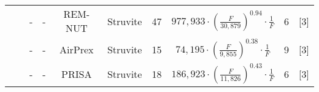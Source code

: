\documentclass[authoryear]{elsarticle}
\begin{document}
\begin{sidewaystable}[!htbp]
{\begin{threeparttable}
\begin{tabular}{@{}cccccccccc@{}}
				&                                                                                                                                                         & -                                                                               & -                                     & REM-NUT                                                                                  & Struvite                                                                          & 47                                                                                    & $977,933 \cdot \left( \frac{F}{30,879} \right)^{0.94} \cdot \frac{1}{F}$                                 & 6                                                            &   [3]       \\
				&                                                                                                                                                         & -                                                                               & -                                     & AirPrex                                                                                  & Struvite                                                                          & 15                                                                                    & $74,195 \cdot \left( \frac{F}{9,855} \right)^{0.38} \cdot \frac{1}{F}$                                  & 9                                                            &     [3]     \\
				&                                                                                                                                                         & -                                                                               & -                                     & PRISA                                                                                    & Struvite                                                                          & 18                                                                                    & $186,923 \cdot \left( \frac{F}{11,826} \right)^{0.43} \cdot \frac{1}{F}$                                  & 6                                                            &     [3]     \\ \cmidrule(l){2-10}

\end{tabular}
\end{threeparttable}}
\end{sidewaystable}
\end{document}
